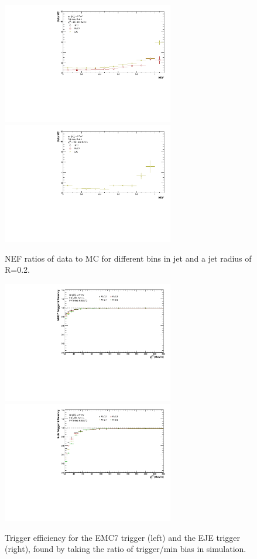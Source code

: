 \begin{figure}[h!]
\begin{multicols}{2}
            \includegraphics[width=7.5cm]{figures/TriggerBias/NEF/hNEF_ptBin3_R02.pdf}
            \includegraphics[width=7.5cm]{figures/TriggerBias/NEF/hNEF_ptBin5_R02.pdf}
        \vfill\null
    \end{multicols}
    \caption{NEF ratios of \pp data to MC for different bins in jet \pT and a jet radius of R=0.2.}
    \label{fig:TriggerBiasNEFR02}
\end{figure}

\begin{figure}[h!]
    \centering
    \begin{multicols}{2}
            \includegraphics[width=7.5cm]{figures/TriggerEfficiency/hEfficiency_EMC7.pdf}
        \vfill\null
        \columnbreak
            \includegraphics[width=7.5cm]{figures/TriggerEfficiency/hEfficiency_EJE.pdf}
        \vfill\null
    \end{multicols}
    \caption{Trigger efficiency for the EMC7 trigger (left) and the EJE trigger (right), found by taking the ratio of trigger/min bias in \pp simulation.}
    \label{fig:TriggerEfficiency}
\end{figure}

